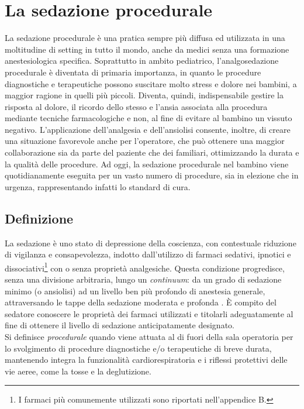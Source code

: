 \chapter{La sedazione procedurale}

La sedazione procedurale è una pratica sempre più diffusa ed utilizzata in una moltitudine di setting in tutto il mondo, anche da medici senza una formazione anestesiologica specifica. 
Soprattutto in ambito pediatrico, l’analgosedazione procedurale è diventata di primaria importanza, in quanto le procedure diagnostiche e terapeutiche possono suscitare molto stress e dolore nei bambini, a maggior ragione in quelli più piccoli. Diventa, quindi, indispensabile gestire la risposta al dolore, il ricordo dello stesso e l’ansia associata alla procedura mediante tecniche farmacologiche e non, al fine di evitare al bambino un vissuto negativo.
L'applicazione dell'analgesia e dell'ansiolisi consente, inoltre, di creare una situazione favorevole anche per l’operatore, che può ottenere una maggior collaborazione sia da parte del paziente che dei familiari, ottimizzando la durata e la qualità delle procedure.
Ad oggi, la sedazione procedurale nel bambino viene quotidianamente eseguita per un vasto numero di procedure, sia in elezione che in urgenza, rappresentando infatti lo standard di cura.





\section{Definizione}

La sedazione è uno stato di depressione della coscienza, con contestuale riduzione di vigilanza e consapevolezza, indotto dall'utilizzo di farmaci sedativi, ipnotici e dissociativi\footnote{I farmaci più comunemente utilizzati sono riportati nell'appendice B.} con o senza proprietà analgesiche. Questa condizione progredisce, senza una divisione arbitraria, lungo un \emph{continuum}: da un grado di sedazione minimo (o ansiolisi) ad un livello ben più profondo di anestesia generale, attraversando le tappe della sedazione moderata e profonda \cite{Krauss2006}. \`E compito del sedatore conoscere le proprietà dei farmaci utilizzati e titolarli adeguatamente al fine di ottenere il livello di sedazione anticipatamente designato.  
\\Si definisce \emph{procedurale} quando viene attuata al di fuori della sala operatoria per lo svolgimento di procedure diagnostiche e/o terapeutiche di breve durata, mantenendo integra la funzionalità cardiorespiratoria e i riflessi protettivi delle vie aeree, come la tosse e la deglutizione. 

